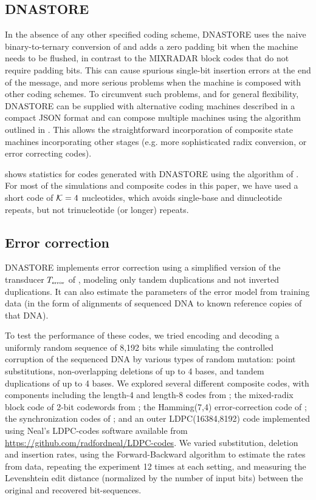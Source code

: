 \documentclass[english]{article}
\begin{document}
\subsection{DNASTORE}

In the absence of any other specified coding scheme,
DNASTORE uses the naive binary-to-ternary conversion of
 and adds a zero padding bit when the machine needs to be flushed,
in contrast to the MIXRADAR block codes that do not require padding bits.
This can cause spurious single-bit insertion errors at the end of the message, and more serious problems when the
machine is composed with other coding schemes.
To circumvent such problems, and for general flexibility,
DNASTORE can be supplied with alternative coding machines described in a compact JSON format
and can compose multiple machines using the algorithm outlined in .
This allows the straightforward incorporation of composite state machines incorporating other stages
(e.g. more sophisticated radix conversion, or error correcting codes).

 shows statistics for codes generated with DNASTORE
using the algorithm of .
For most of the simulations and composite codes in this paper, we have used a short code of ${\cal K}=4$ nucleotides,
which avoids single-base and dinucleotide repeats,
but not trinucleotide (or longer) repeats.

\subsection{Error correction}

DNASTORE implements error correction using a simplified version of the transducer $T_{\mbox{\tiny error}}$
of , modeling only tandem duplications and not inverted duplications.
It can also estimate the parameters of the error model from training data
(in the form of alignments of sequenced DNA to known reference copies of that DNA).

To test the performance of these codes, we tried encoding and decoding a uniformly random sequence of 8,192 bits
while simulating the controlled corruption of the sequenced DNA by various types of random mutation:
point substitutions, non-overlapping deletions of up to 4 bases, and tandem duplications of up to 4 bases.
We explored several different composite codes, with components including
the length-4 and length-8 codes from ;
the mixed-radix block code of 2-bit codewords from ;
the Hamming(7,4) error-correction code of ;
the synchronization codes of ;
and an outer LDPC(16384,8192) code implemented using Neal's LDPC-codes
software available from \url{https://github.com/radfordneal/LDPC-codes}.
We varied substitution, deletion and insertion rates,
using the Forward-Backward algorithm to estimate the rates from data,
repeating the experiment 12 times at each setting,
and measuring the Levenshtein edit distance (normalized by the number of input bits) between the original and recovered bit-sequences.
\end{document}
